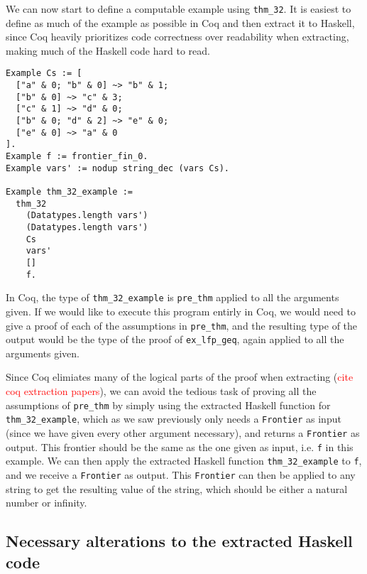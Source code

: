We can now start to define a computable example using \lstinline{thm_32}.
It is easiest to define as much of the example as possible in Coq and then extract it to Haskell,
since Coq heavily prioritizes code correctness over readability when extracting,
making much of the Haskell code hard to read.

\begin{minipage}{\linewidth}
\begin{lstlisting}[language=Coq, label={lst:thm_32_coq_example}, caption={\lstinline{thm_32} example}]
Example Cs := [
  ["a" & 0; "b" & 0] ~> "b" & 1;
  ["b" & 0] ~> "c" & 3;
  ["c" & 1] ~> "d" & 0;
  ["b" & 0; "d" & 2] ~> "e" & 0;
  ["e" & 0] ~> "a" & 0
].
Example f := frontier_fin_0.
Example vars' := nodup string_dec (vars Cs).

Example thm_32_example :=
  thm_32
    (Datatypes.length vars')
    (Datatypes.length vars')
    Cs
    vars'
    []
    f.
\end{lstlisting}
\end{minipage}

In Coq, the type of \lstinline{thm_32_example} is \lstinline{pre_thm} applied to all the arguments given.
If we would like to execute this program entirly in Coq, we would need to give a proof of each of the assumptions
in \lstinline{pre_thm}, and the resulting type of the output would be the type of the proof of \lstinline{ex_lfp_geq},
again applied to all the arguments given.

Since Coq elimiates many of the logical parts of the proof when extracting (\textcolor{red}{cite coq extraction papers}),
we can avoid the tedious task of proving all the assumptions of \lstinline{pre_thm} by simply
using the extracted Haskell function for \lstinline{thm_32_example}, which as we saw previously only needs a \lstinline{Frontier}
as input (since we have given every other argument necessary), and returns a \lstinline{Frontier} as output.
This frontier should be the same as the one given as input, i.e. \lstinline{f} in this example.
We can then apply the extracted Haskell function \lstinline{thm_32_example} to \lstinline{f},
and we receive a \lstinline{Frontier} as output.
This \lstinline{Frontier} can then be applied to any string to get the resulting value of the string,
which should be either a natural number or infinity.

\subsection{Necessary alterations to the extracted Haskell code}

